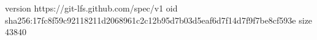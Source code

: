 version https://git-lfs.github.com/spec/v1
oid sha256:17fc8f59c92118211d2068961c2c12b95d7b03d5eaf6d7f14d7f9f7be8cf593e
size 43840
